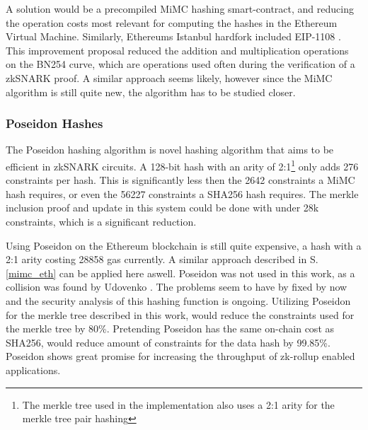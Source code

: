 \documentclass[../../thesis.tex]{subfiles}
\begin{document}
A solution would be a precompiled MiMC hashing smart-contract, and reducing the operation costs most relevant for computing the hashes in the Ethereum Virtual Machine. Similarly, Ethereums Istanbul hardfork included EIP-1108 \cite{eip_1108}. This improvement proposal reduced the addition and multiplication operations on the BN254 curve, which are operations used often during the verification of a zkSNARK proof. A similar approach seems likely, however since the MiMC algorithm is still quite new, the algorithm has to be studied closer. 

\subsubsection{Poseidon Hashes}
The Poseidon \cite{grassi2020poseidon} hashing algorithm is novel hashing algorithm that aims to be efficient in zkSNARK circuits. A 128-bit hash with an arity of 2:1\footnote{The merkle tree used in the implementation also uses a 2:1 arity for the merkle tree pair hashing} only adds 276 constraints per hash. This is significantly less then the 2642 constraints a MiMC hash requires, or even the 56227 constraints a SHA256 hash requires. The merkle inclusion proof and update in this system could be done with under 28k constraints, which is a significant reduction. 

Using Poseidon on the Ethereum blockchain is still quite expensive, a hash with a 2:1 arity costing 28858 gas currently. A similar approach described in S. \ref{mimc_eth} can be applied here aswell. Poseidon was not used in this work, as a collision was found by Udovenko \cite{udovenko2020optimized}. The problems seem to have by fixed by now and the security analysis of this hashing function is ongoing. Utilizing Poseidon for the merkle tree described in this work, would reduce the constraints used for the merkle tree by 80\%. Pretending Poseidon has the same on-chain cost as SHA256, would reduce amount of constraints for the data hash by 99.85\%. Poseidon shows great promise for increasing the throughput of zk-rollup enabled applications. 
\end{document}
